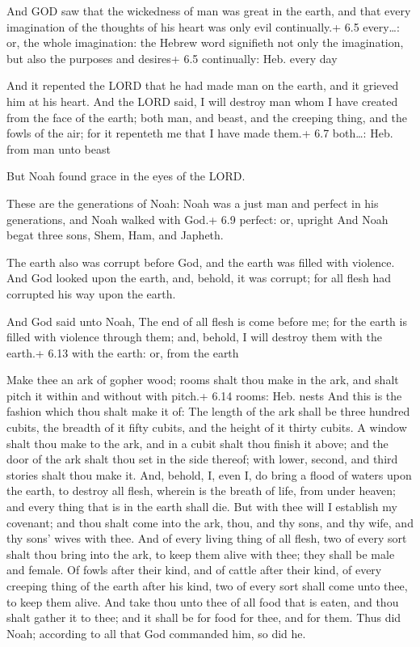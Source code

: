  And GOD saw that the wickedness of man was great in the
earth, and that every imagination of the thoughts of his heart was only
evil continually.+ 6.5 every\ldots: or, the whole imagination: the
Hebrew word signifieth not only the imagination, but also the purposes
and desires+ 6.5 continually: Heb. every day

 And it repented the LORD that he had made man on the earth,
and it grieved him at his heart.  And the LORD said, I will
destroy man whom I have created from the face of the earth; both man,
and beast, and the creeping thing, and the fowls of the air; for it
repenteth me that I have made them.+ 6.7 both\ldots: Heb. from man unto
beast

 But Noah found grace in the eyes of the LORD.

 These are the generations of Noah: Noah was a just man
and perfect in his generations, and Noah walked with God.+ 6.9 perfect:
or, upright  And Noah begat three sons, Shem, Ham, and
Japheth.

 The earth also was corrupt before God, and the earth was
filled with violence.  And God looked upon the earth, and,
behold, it was corrupt; for all flesh had corrupted his way upon the
earth.

 And God said unto Noah, The end of all flesh is come
before me; for the earth is filled with violence through them; and,
behold, I will destroy them with the earth.+ 6.13 with the earth: or,
from the earth

 Make thee an ark of gopher wood; rooms shalt thou make
in the ark, and shalt pitch it within and without with pitch.+ 6.14
rooms: Heb. nests  And this is the fashion which thou shalt
make it of: The length of the ark shall be three hundred cubits, the
breadth of it fifty cubits, and the height of it thirty cubits.
 A window shalt thou make to the ark, and in a cubit shalt
thou finish it above; and the door of the ark shalt thou set in the side
thereof; with lower, second, and third stories shalt thou make it.
 And, behold, I, even I, do bring a flood of waters upon
the earth, to destroy all flesh, wherein is the breath of life, from
under heaven; and every thing that is in the earth shall die.
 But with thee will I establish my covenant; and thou shalt
come into the ark, thou, and thy sons, and thy wife, and thy sons' wives
with thee.  And of every living thing of all flesh, two of
every sort shalt thou bring into the ark, to keep them alive with thee;
they shall be male and female.  Of fowls after their kind,
and of cattle after their kind, of every creeping thing of the earth
after his kind, two of every sort shall come unto thee, to keep them
alive.  And take thou unto thee of all food that is eaten,
and thou shalt gather it to thee; and it shall be for food for thee, and
for them.  Thus did Noah; according to all that God
commanded him, so did he.

